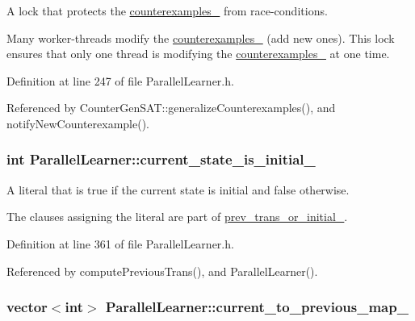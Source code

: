 A lock that protects the \hyperlink{classParallelLearner_a974943e3e2145b3407f689b64acdd33f}{counterexamples\-\_\-} from race-\/conditions. 

Many worker-\/threads modify the \hyperlink{classParallelLearner_a974943e3e2145b3407f689b64acdd33f}{counterexamples\-\_\-} (add new ones). This lock ensures that only one thread is modifying the \hyperlink{classParallelLearner_a974943e3e2145b3407f689b64acdd33f}{counterexamples\-\_\-} at one time. 

Definition at line 247 of file Parallel\-Learner.\-h.



Referenced by Counter\-Gen\-S\-A\-T\-::generalize\-Counterexamples(), and notify\-New\-Counterexample().

\hypertarget{classParallelLearner_ae9293a4afd3c52690bcac2ad03884121}{
\subsubsection[{current\-\_\-state\-\_\-is\-\_\-initial\-\_\-}]{\setlength{\rightskip}{0pt plus 5cm}int Parallel\-Learner\-::current\-\_\-state\-\_\-is\-\_\-initial\-\_\-\hspace{0.3cm}{\ttfamily [protected]}}}\label{classParallelLearner_ae9293a4afd3c52690bcac2ad03884121}


A literal that is true if the current state is initial and false otherwise. 

The clauses assigning the literal are part of \hyperlink{classParallelLearner_ac73d9338262855f61f23a65d1df0647c}{prev\-\_\-trans\-\_\-or\-\_\-initial\-\_\-}. 

Definition at line 361 of file Parallel\-Learner.\-h.



Referenced by compute\-Previous\-Trans(), and Parallel\-Learner().

\hypertarget{classParallelLearner_a6f8dfda6aa8640345057023ed85882b9}{
\subsubsection[{current\-\_\-to\-\_\-previous\-\_\-map\-\_\-}]{\setlength{\rightskip}{0pt plus 5cm}vector$<$int$>$ Parallel\-Learner\-::current\-\_\-to\-\_\-previous\-\_\-map\-\_\-\hspace{0.3cm}{\ttfamily [protected]}}}\label{classParallelLearner_a6f8dfda6aa8640345057023ed85882b9}


